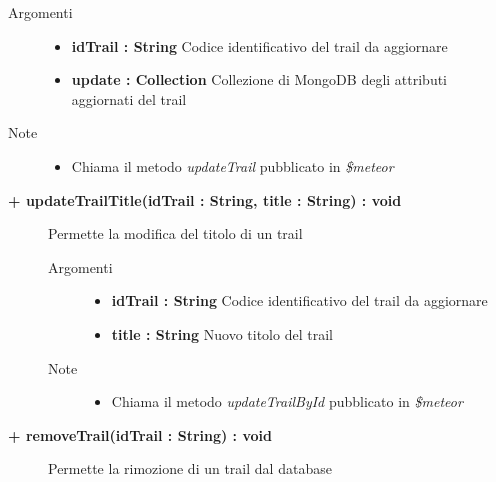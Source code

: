 \begin{description}
\begin{description}
		\begin{description}
			\item[Argomenti] \hfill
				\begin{itemize}
					\item \textbf{idTrail : String			} \hfill
					Codice identificativo del trail da aggiornare
					\item \textbf{update :  Collection			} \hfill
					Collezione di MongoDB degli attributi aggiornati del trail
					
				\end{itemize}
			\item[Note] \hfill
			\begin{itemize}
					\item Chiama il metodo \textit{updateTrail} pubblicato in \textit{\$meteor}
			\end{itemize}
		\end{description}
	\end{description}
	
	\begin{description}
		\item[\textbf{\color{blue}+ updateTrailTitle(idTrail : String, title : String) : void			}] \hfill
			Permette la modifica del titolo di un trail
			
		\begin{description}
			\item[Argomenti] \hfill
				\begin{itemize}
					\item \textbf{idTrail : String			} \hfill
					Codice identificativo del trail da aggiornare
					\item \textbf{title : String			} \hfill
					Nuovo titolo del trail
					
				\end{itemize}
			\item[Note] \hfill
			\begin{itemize}
					\item Chiama il metodo \textit{updateTrailById} pubblicato in \textit{\$meteor}
			\end{itemize}
		\end{description}
	\end{description}
	
	\begin{description}
		\item[\textbf{\color{blue}+ removeTrail(idTrail : String) : void			}] \hfill
			Permette la rimozione di un trail dal database
			

\end{description}
\end{description}
